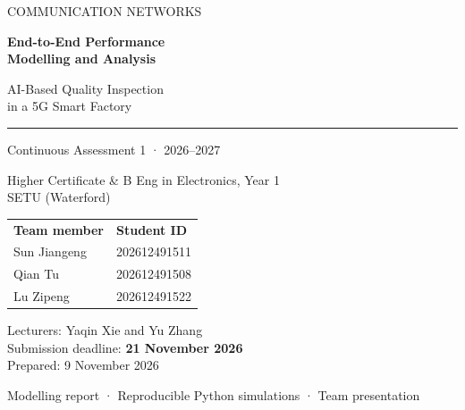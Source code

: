 \begin{titlepage}
\thispagestyle{empty}
\vspace*{1.4cm}
{\sffamily\large\color{navy}COMMUNICATION NETWORKS\par}
\vspace{1.3cm}
{\sffamily\bfseries\Huge End-to-End Performance\\[0.15cm] Modelling and Analysis\par}
\vspace{0.7cm}
{\sffamily\LARGE AI-Based Quality Inspection\\in a 5G Smart Factory\par}
\vspace{0.9cm}
{\color{teal}\rule{\textwidth}{2pt}}
\vspace{0.5cm}
{\large Continuous Assessment 1 · 2026–2027\par}
Higher Certificate \& B Eng in Electronics, Year 1\\
SETU (Waterford)\par
\vspace{1.1cm}
\begin{tabular}{ll}
\textbf{Team member} & \textbf{Student ID}\\[0.2cm]
Sun Jiangeng & 202612491511\\[0.15cm]
Qian Tu & 202612491508\\[0.15cm]
Lu Zipeng & 202612491522\\
\end{tabular}\par
\vfill
Lecturers: Yaqin Xie and Yu Zhang\\[0.15cm]
Submission deadline: \textbf{21 November 2026}\\
Prepared: 9 November 2026
\vspace{0.7cm}
\par{\small Modelling report · Reproducible Python simulations · Team presentation}
\end{titlepage}
